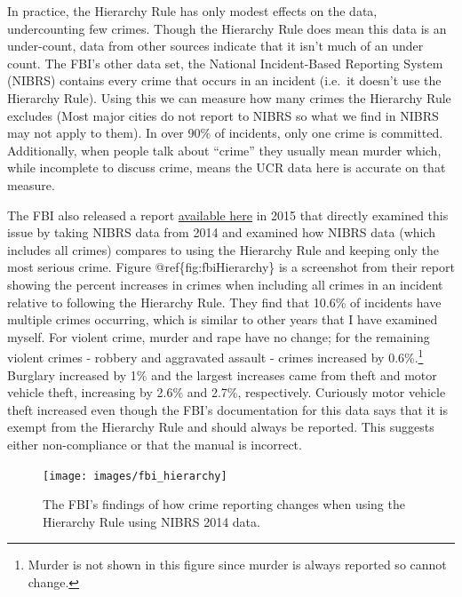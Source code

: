 \documentclass[
  12pt,
  openany]{book}
\begin{document}
In practice, the Hierarchy Rule has only modest effects on the data, undercounting few crimes. Though the Hierarchy Rule does mean this data is an under-count, data from other sources indicate that it isn't much of an under count. The FBI's other data set, the National Incident-Based Reporting System (NIBRS) contains every crime that occurs in an incident (i.e.~it doesn't use the Hierarchy Rule). Using this we can measure how many crimes the Hierarchy Rule excludes (Most major cities do not report to NIBRS so what we find in NIBRS may not apply to them). In over 90\% of incidents, only one crime is committed. Additionally, when people talk about ``crime'' they usually mean murder which, while incomplete to discuss crime, means the UCR data here is accurate on that measure.

The FBI also released a report \href{https://ucr.fbi.gov/nibrs/2014/resource-pages/effects_of_nibrs_on_crime_statistics_final.pdf}{available here} in 2015 that directly examined this issue by taking NIBRS data from 2014 and examined how NIBRS data (which includes all crimes) compares to using the Hierarchy Rule and keeping only the most serious crime. Figure @ref\{fig:fbiHierarchy\} is a screenshot from their report showing the percent increases in crimes when including all crimes in an incident relative to following the Hierarchy Rule. They find that 10.6\% of incidents have multiple crimes occurring, which is similar to other years that I have examined myself. For violent crime, murder and rape have no change; for the remaining violent crimes - robbery and aggravated assault - crimes increased by 0.6\%.\footnote{Murder is not shown in this figure since murder is always reported so cannot change.} Burglary increased by 1\% and the largest increases came from theft and motor vehicle theft, increasing by 2.6\% and 2.7\%, respectively. Curiously motor vehicle theft increased even though the FBI's documentation for this data says that it is exempt from the Hierarchy Rule and should always be reported. This suggests either non-compliance or that the manual is incorrect.

\begin{figure}

{\centering \texttt{[image: images/fbi\_hierarchy]} 

}

\caption{The FBI's findings of how crime reporting changes when using the Hierarchy Rule using NIBRS 2014 data.}\label{fig:fbiHierarchy}
\end{figure}
\end{document}
